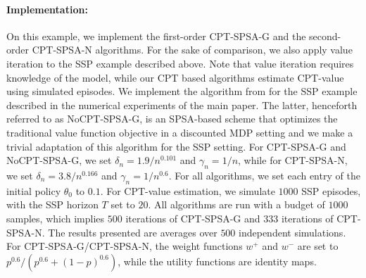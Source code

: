 \documentclass[11pt,letterpaper,english]{article}
\begin{document}
\paragraph{Implementation:} On this example, we implement the first-order CPT-SPSA-G and the second-order CPT-SPSA-N algorithms. For the sake of comparison, we also apply value iteration to the SSP example described above. 
Note that value iteration requires knowledge of the model, while our CPT based algorithms estimate CPT-value using simulated episodes.
We implement the algorithm from \cite{bhatnagar2004simultaneous} for the SSP example described in the numerical experiments of the main paper. The latter, henceforth referred to as NoCPT-SPSA-G, is an SPSA-based scheme that optimizes the traditional value function objective in a discounted MDP setting and we make a trivial adaptation of this algorithm for the SSP setting.
For CPT-SPSA-G and NoCPT-SPSA-G, we set $\delta_n = 1.9/n^{0.101}$ and $\gamma_n = 1/n$, while for CPT-SPSA-N, we set $\delta_n=3.8/n^{0.166}$ and $\gamma_n=1/n^{0.6}$. For all algorithms, we set each entry of the initial policy $\theta_0$ to $0.1$. For CPT-value estimation, we simulate $1000$ SSP episodes, with the SSP horizon $T$ set to $20$. All algorithms are run with a budget of $1000$ samples, which implies $500$ iterations of CPT-SPSA-G and $333$ iterations of CPT-SPSA-N. The results presented are averages over $500$ independent simulations. For CPT-SPSA-G/CPT-SPSA-N, 
the weight functions $w^+$ and $w^-$ are set to $p^{0.6}/(p^{0.6}+(1-p)^{0.6})$, while the utility functions are identity maps. 
\end{document}
